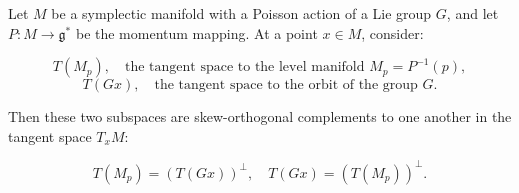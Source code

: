Let $M$ be a symplectic manifold with a Poisson action of a Lie group $G$, and let $P: M \to \mathfrak{g}^*$ be the momentum mapping. At a point $x \in M$, consider:

$$T(M_p), \quad \text{the tangent space to the level manifold } M_p = P^{-1}(p),$$
$$T(Gx), \quad \text{the tangent space to the orbit of the group } G.$$

Then these two subspaces are skew-orthogonal complements to one another in the tangent space $T_x M$:

$$T(M_p) = \left( T(Gx) \right)^{\perp}, \quad T(Gx) = \left( T(M_p) \right)^{\perp}.$$
